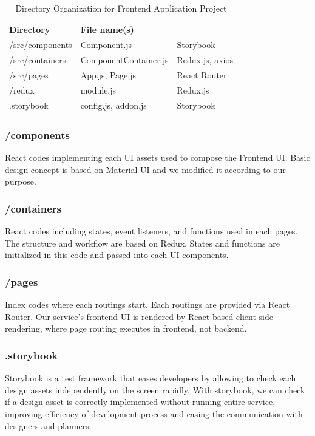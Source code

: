 \documentclass[conference,compsoc]{IEEEtran}
\begin{document}
\begin{table}[ht!] \renewcommand\arraystretch{1.25}
  \begin{threeparttable}
      \caption{Directory Organization for Frontend Application Project%
      \label{tab:table5}}    %
      \begin{tabular}{@{}l l>{\raggedright\arraybackslash}p{3.2cm}@{}}
      \toprule
      \bfseries Directory & \bfseries File name(s) & \multicolumn{1}{l}{\bfseries Modules used} \\
      \midrule
      /src/components & Component.js & Storybook \\
      /src/containers & ComponentContainer.js & Redux.js, axios \\
      /src/pages & App.js, Page.js & React Router \\
      /redux & module.js & Redux.js \\
      .storybook & config.js, addon.js & Storybook \\
      \bottomrule
      \end{tabular}
  \end{threeparttable}
\end{table}

\subsubsection{/components}
React codes implementing each UI assets used to compose the Frontend UI. Basic design concept is based on Material-UI and we modified it according to our purpose.

\subsubsection{/containers}
React codes including states, event listeners, and functions used in each pages. The structure and workflow are based on Redux. States and functions are initialized in this code and passed into each UI components.

\subsubsection{/pages}
Index codes where each routings start. Each routings are provided via React Router. Our service's frontend UI is rendered by React-based client-side rendering, where page routing executes in frontend, not backend.

\subsubsection{.storybook}
Storybook is a test framework that eases developers by allowing to check each design assets independently on the screen rapidly. With storybook, we can check if a design asset is correctly implemented without running entire service, improving efficiency of development process and easing the communication with designers and planners.
\end{document}
